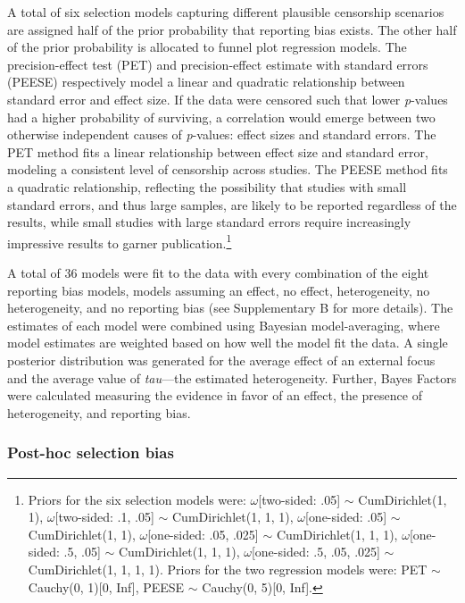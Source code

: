 \documentclass[
  man, donotrepeattitle,floatsintext]{apa7}
\begin{document}
A total of six selection models capturing different plausible censorship scenarios are assigned half of the prior probability that reporting bias exists. The other half of the prior probability is allocated to funnel plot regression models. The precision-effect test (PET) and precision-effect estimate with standard errors (PEESE) respectively model a linear and quadratic relationship between standard error and effect size. If the data were censored such that lower \emph{p}-values had a higher probability of surviving, a correlation would emerge between two otherwise independent causes of \emph{p}-values: effect sizes and standard errors. The PET method fits a linear relationship between effect size and standard error, modeling a consistent level of censorship across studies. The PEESE method fits a quadratic relationship, reflecting the possibility that studies with small standard errors, and thus large samples, are likely to be reported regardless of the results, while small studies with large standard errors require increasingly impressive results to garner publication.\footnote{Priors for the six selection models were: \(\omega\){[}two-sided: .05{]} \(\sim\) CumDirichlet(1, 1), \(\omega\){[}two-sided: .1, .05{]} \(\sim\) CumDirichlet(1, 1, 1), \(\omega\){[}one-sided: .05{]} \(\sim\) CumDirichlet(1, 1), \(\omega\){[}one-sided: .05, .025{]} \(\sim\) CumDirichlet(1, 1, 1), \(\omega\){[}one-sided: .5, .05{]} \(\sim\) CumDirichlet(1, 1, 1), \(\omega\){[}one-sided: .5, .05, .025{]} \(\sim\) CumDirichlet(1, 1, 1, 1). Priors for the two regression models were: PET \(\sim\) Cauchy(0, 1){[}0, Inf{]}, PEESE \(\sim\) Cauchy(0, 5){[}0, Inf{]}.}

A total of 36 models were fit to the data with every combination of the eight reporting bias models, models assuming an effect, no effect, heterogeneity, no heterogeneity, and no reporting bias (see Supplementary B for more details). The estimates of each model were combined using Bayesian model-averaging, where model estimates are weighted based on how well the model fit the data. A single posterior distribution was generated for the average effect of an external focus and the average value of \emph{tau}---the estimated heterogeneity. Further, Bayes Factors were calculated measuring the evidence in favor of an effect, the presence of heterogeneity, and reporting bias.

\hypertarget{post-hoc-selection-bias}{%
\subsubsection{Post-hoc selection bias}\label{post-hoc-selection-bias}}
\end{document}
